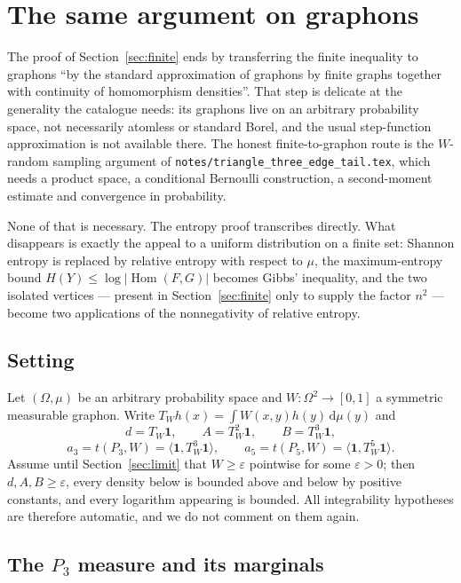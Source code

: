 \documentclass[11pt]{article}
\DeclareMathOperator{\Hom}{Hom}
\newcommand{\dd}{\,\mathrm d}
\begin{document}
\section{The same argument on graphons}
\label{sec:graphon}

The proof of Section~\ref{sec:finite} ends by transferring the finite
inequality to graphons ``by the standard approximation of graphons by finite
graphs together with continuity of homomorphism densities''.  That step is
delicate at the generality the catalogue needs: its graphons live on an
arbitrary probability space, not necessarily atomless or standard Borel, and
the usual step-function approximation is not available there.  The honest
finite-to-graphon route is the $W$-random sampling argument of
\texttt{notes/triangle\_three\_edge\_tail.tex}, which needs a product space, a
conditional Bernoulli construction, a second-moment estimate and convergence in
probability.

None of that is necessary.  The entropy proof transcribes directly.  What
disappears is exactly the appeal to a uniform distribution on a finite set:
Shannon entropy is replaced by relative entropy with respect to $\mu$, the
maximum-entropy bound $H(Y)\leq\log|\Hom(F,G)|$ becomes Gibbs' inequality, and
the two isolated vertices --- present in Section~\ref{sec:finite} only to
supply the factor $n^2$ --- become two applications of the nonnegativity of
relative entropy.

\subsection{Setting}

Let $(\Omega,\mu)$ be an arbitrary probability space and $W\colon\Omega^2\to[0,1]$
a symmetric measurable graphon.  Write $T_Wh(x)=\int W(x,y)h(y)\dd\mu(y)$ and
\[
 d=T_W\mathbf1,\qquad A=T_W^2\mathbf1,\qquad B=T_W^3\mathbf1,
\]
\[
 a_3=t(P_3,W)=\langle\mathbf1,T_W^3\mathbf1\rangle,\qquad
 a_5=t(P_5,W)=\langle\mathbf1,T_W^5\mathbf1\rangle .
\]
Assume until Section~\ref{sec:limit} that $W\geq\varepsilon$ pointwise for some
$\varepsilon>0$; then $d,A,B\geq\varepsilon$, every density below is bounded
above and below by positive constants, and every logarithm appearing is
bounded.  All integrability hypotheses are therefore automatic, and we do not
comment on them again.

\subsection{The $P_3$ measure and its marginals}
\end{document}
